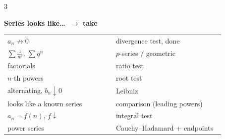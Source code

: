 \begin{multicols}{3}
{\vspace{2pt}
\textbf{\sffamily\color{subText}Series looks like\ldots\ $\rightarrow$ take}\par\nobreak\vspace{1pt}
\begin{tabular}{@{}>{\raggedright\arraybackslash}p{0.48\linewidth}>{\raggedright\arraybackslash}p{0.48\linewidth}@{}}
\midrule
$a_n\not\to0$ & divergence test, done \\
$\sum\frac1{n^p}$, $\sum q^n$ & $p$-series / geometric \\
factorials & ratio test \\
$n$-th powers & root test \\
alternating, $b_n\downarrow0$ & Leibniz \\
looks like a known series & comparison (leading powers) \\
$a_n=f(n)$, $f\downarrow$ & integral test \\
power series & Cauchy--Hadamard $+$ endpoints \\
\end{tabular}
}
\end{multicols}

